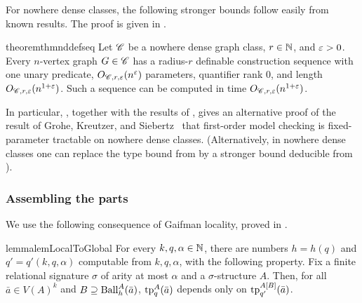 For nowhere dense classes, the following stronger bounds follow easily from known results. The proof is given in .


\begin{restatable}{theorem}{thmnddefseq}\label{thm:nd-def-seq}
  Let $\mathscr C$ be a nowhere dense graph class, $r\in\mathbb N$, and $\varepsilon>0$.
  Every $n$-vertex graph $G\in\mathscr C$ has a radius-$r$ definable construction sequence with one unary predicate, $O_{\mathscr C,r,\varepsilon}(n^\varepsilon)$ parameters, quantifier rank $0$, and length $O_{\mathscr C,r,\varepsilon}(n^{1+\varepsilon})$.
  Such a sequence can be computed in time $O_{\mathscr C,r,\varepsilon}(n^{1+\varepsilon})$.
\end{restatable}

In particular, , together with the results of , gives an alternative proof of the result of Grohe, Kreutzer, and Siebertz~\cite{gks} that first-order model checking is fixed-parameter tractable on nowhere dense classes.
(Alternatively, in nowhere dense classes one can replace the type bound from   by a stronger bound deducible from \cite{number-of-types}).
  


\subsubsection{Assembling the parts}\label{sec:skel-assembly}

We use the following consequence of Gaifman locality, proved in .

\begin{restatable}{lemma}{lemLocalToGlobal}\label{lem:local-to-global}
For every $k,q,\alpha \in\mathbb N$, there are numbers $h=h(q)$ and $q'=q'(k,q,\alpha)$ computable from $k,q,\alpha$,
 with the following property.
Fix a finite relational signature $\sigma$ of arity at most $\alpha$ and a $\sigma$-structure $A$.
Then, for all $\bar a\in V(A)^k$
and $B\supseteq \operatorname{Ball}_h^A(\bar a)$,
$\textnormal{tp}_q^A(\bar a)$ depends only on
 $\textnormal{tp}_{q'}^{A[B]}(\bar a)$.
\end{restatable}

